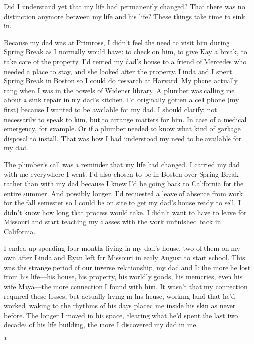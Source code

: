 \documentclass[12pt]{book}
\begin{document}
Did I understand yet that my life had permanently changed? That there was no distinction anymore between my life and his life? These things take time to sink in.

Because my dad was at Primrose, I didn't feel the need to visit him during Spring Break as I normally would have: to check on him, to give Kay a break, to take care of the property. I'd rented my dad's house to a friend of Mercedes who needed a place to stay, and she looked after the property. Linda and I spent Spring Break in Boston so I could do research at Harvard. My phone actually rang when I was in the bowels of Widener library. A plumber was calling me about a sink repair in my dad's kitchen. I'd originally gotten a cell phone (my first) because I wanted to be available for my dad. I should clarify: not necessarily to speak to him, but to arrange matters for him. In case of a medical emergency, for example. Or if a plumber needed to know what kind of garbage disposal to install. That was how I had understood my need to be available for my dad.

The plumber's call was a reminder that my life had changed. I carried my dad with me everywhere I went. I'd also chosen to be in Boston over Spring Break rather than with my dad because I knew I'd be going back to California for the entire summer. And possibly longer. I'd requested a leave of absence from work for the fall semester so I could be on site to get my dad's house ready to sell. I didn't know how long that process would take. I didn't want to have to leave for Missouri and start teaching my classes with the work unfinished back in California.

I ended up spending four months living in my dad's house, two of them on my own after Linda and Ryan left for Missouri in early August to start school. This was the strange period of our inverse relationship, my dad and I: the more he lost from his life---his house, his property, his worldly goods, his memories, even his wife Maya---the more connection I found with him. It wasn't that my connection required these losses, but actually living in his house, working land that he'd worked, waking to the rhythms of his days placed me inside his skin as never before. The longer I moved in his space, clearing what he'd spent the last two decades of his life building, the more I discovered my dad in me.

\begin{center}$*$\end{center}
\end{document}
